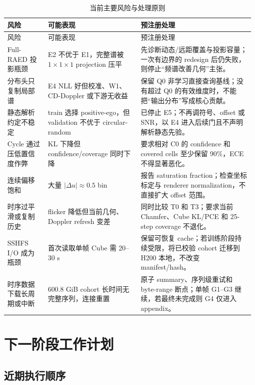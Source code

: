 \documentclass[11pt,a4paper,fontset=none]{ctexart}
\begin{document}
\begin{longtable}{p{3.2cm} p{5.5cm} p{6.0cm}}
\caption{当前主要风险与处理原则}\\
\toprule
风险 & 可能表现 & 预注册处理 \\
\midrule
\endfirsthead
\toprule
风险 & 可能表现 & 预注册处理 \\
\midrule
\endhead
Full-RAED 投影瓶颈 & E2 不优于 E1，完整谱被 $1\times1\times1$ projection 压平 & 先诊断动态/远距覆盖与投影容量；一次有边界的 redesign 后仍失败，则停止“频谱改善几何”主张。\\
分布头只复制局部谱 & E4 NLL 好但校准、W1、CD-Doppler 或下游无收益 & 保留 Q0 非学习直接查询基线；没有超过 Q0 的有效维度时，不能把“输出分布”写成核心贡献。\\
静态解析约定不稳定 & train 选择 positive-ego，但 validation 不优于 circular-random & 已停止 E5；不再调符号、offset 或 SNR，以 E4 进入后续门且不声明解析静态先验。\\
Cycle 通过压低置信度作弊 & KL 下降但 confidence/coverage 同时下降 & 要求相对 C0 的 confidence 和 covered cells 至少保留 90\%，ECE 不得显著恶化。\\
连续偏移饱和 & 大量 $|\Delta u|\approx0.5$ bin & 报告 saturation fraction；检查坐标标定与 renderer normalization，不直接扩大 offset 范围。\\
时序过平滑或复制历史 & flicker 降低但当前几何、Doppler refresh 变差 & 同时比较 T0 和 T3；要求当前 Chamfer、Cube KL/PCE 和 25-step coverage 不退化。\\
SSHFS I/O 成为瓶颈 & 首次读取单帧 Cube 需 20--30 s & 保留可恢复 cache；若训练阶段持续受限，将已校验 cohort 迁移到 H200 本地，不改变 manifest/hash。\\
时序数据下载长周期或中断 & 600.8 GiB cohort 长时间无完整序列，连接重置 & 原子 summary、序列级重试和 byte-range 断点；单帧 G1--G3 继续，若最终未完成则 G4 仅进入 appendix。\\
\bottomrule
\end{longtable}

\section{下一阶段工作计划}

\subsection{近期执行顺序}
\end{document}
